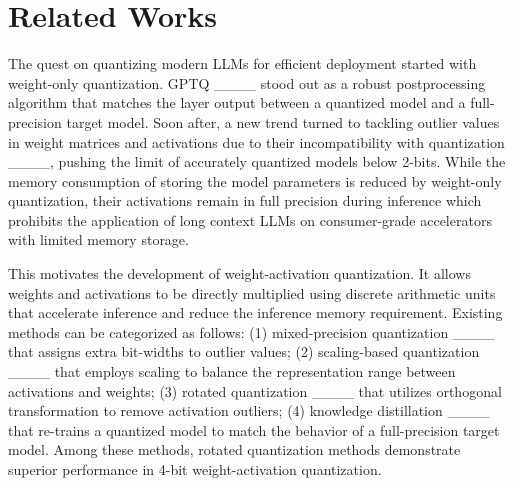 \section{Related Works}
The quest on quantizing modern LLMs for efficient deployment started with weight-only quantization. GPTQ ____ stood out as a robust postprocessing algorithm that matches the layer output between a quantized model and a full-precision target model. Soon after, a new trend turned to tackling outlier values in weight matrices and activations due to their incompatibility with quantization ____, pushing the limit of accurately quantized models below 2-bits.
While the memory consumption of storing the model parameters is reduced by weight-only quantization, their activations remain in full precision during inference which prohibits the application of long context LLMs on consumer-grade accelerators with limited memory storage.

This motivates the development of weight-activation quantization. It allows weights and activations to be directly multiplied using discrete arithmetic units that accelerate inference and reduce the inference memory requirement.
Existing methods can be categorized as follows: 
(1) mixed-precision quantization  ____ that assigns extra bit-widths to outlier values;
(2) scaling-based quantization ____ that employs scaling to balance the representation range between activations and weights;
(3) rotated quantization ____ that utilizes orthogonal transformation to remove activation outliers; 
(4) knowledge distillation ____ that re-trains a quantized model to match the behavior of a full-precision target model.
Among these methods, rotated quantization methods demonstrate superior performance in 4-bit weight-activation quantization.